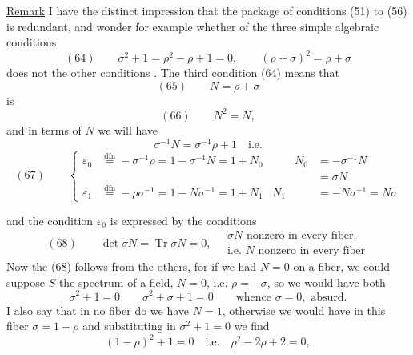 \uline{Remark} I have the distinct impression that the package of conditions (51) to (56) is redundant, and wonder for example whether  of the three simple algebraic conditions
\[
(64)\qquad \sigma^2+1=\rho^2-\rho+1=0,\qquad (\rho+\sigma)^2=\rho+\sigma
\]
does not  the other conditions . The third condition (64) means that
\[
(65)\qquad N=\rho+\sigma
\]
is 
\[
(66)\qquad N^2=N,
\]
and in terms of $N$ we will have
\[
\sigma^{-1}N=\sigma^{-1}\rho+1\quad\text{i.e.}
\]
\[
(67)\qquad
\left\{\begin{aligned}
\varepsilon_0&\overset{\mathrm{dfn}}{=}-\sigma^{-1}\rho=1-\sigma^{-1}N=1+N_0
&\qquad N_0&=-\sigma^{-1}N\\[-2pt]
&&&=\sigma N\\
\varepsilon_1&\overset{\mathrm{dfn}}{=}-\rho\sigma^{-1}=1-N\sigma^{-1}=1+N_1
& N_1&=-N\sigma^{-1}=N\sigma
\end{aligned}\right.
\]

and the condition $\varepsilon_0$   is expressed by the conditions
\[
(68)\qquad \det\sigma N=\operatorname{Tr}\sigma N=0,\quad
\begin{gathered}
\sigma N\text{ nonzero in every fiber.}\\
\text{i.e. }N\text{ nonzero in every fiber}
\end{gathered}
\]
Now the   (68) follows from the others, for if we had $N=0$ on a fiber, we could suppose $S$ the spectrum of a field, $N=0$, i.e. $\rho=-\sigma$, so  we would have both
\[
\sigma^2+1=0\qquad \sigma^2+\sigma+1=0
\qquad\text{whence }\sigma=0,\text{ absurd.}
\]
I also say that in no fiber do we have $N=1$, otherwise we would have in this fiber  $\sigma=1-\rho$ and substituting in $\sigma^2+1=0$ we find 
\[
(1-\rho)^2+1=0\quad\text{i.e.}\quad \rho^2-2\rho+2=0,
\]


